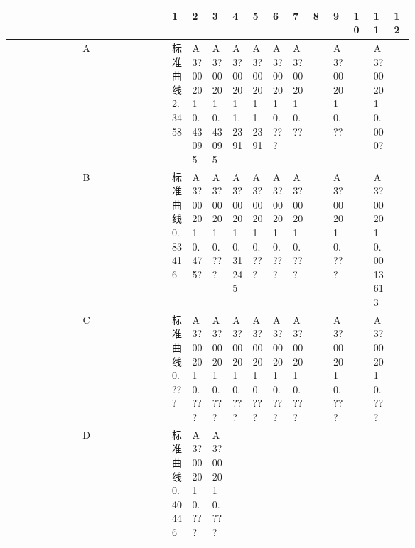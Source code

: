 \documentclass[UTF8,10pt,a4paper,fontset=fandol]{ctexart}
\renewcommand{\arraystretch}{1.15}
\begin{document}
\begin{center}
\scriptsize
\renewcommand{\arraystretch}{1.35}
\begin{tabular}{c|*{12}{p{0.055\linewidth}|}}
 & 1 & 2 & 3 & 4 & 5 & 6 & 7 & 8 & 9 & 10 & 11 & 12\\ \hline
A &
\shortstack{标准曲线\\2.3458} &
\shortstack{A3?00201\\0.43095} &
\shortstack{A3?00201\\0.43095} &
\shortstack{A3?00201\\1.2391} &
\shortstack{A3?00201\\1.2391} &
\shortstack{A3?00201\\0.???} &
\shortstack{A3?00201\\0.??} &
 &
\shortstack{A3?00201\\0.??} &
 &
\shortstack{A3?00201\\0.000?} &
\\ \hline
B &
\shortstack{标准曲线\\0.83416} &
\shortstack{A3?00201\\0.475?} &
\shortstack{A3?00201\\0.???} &
\shortstack{A3?00201\\0.31245} &
\shortstack{A3?00201\\0.???} &
\shortstack{A3?00201\\0.???} &
\shortstack{A3?00201\\0.???} &
 &
\shortstack{A3?00201\\0.???} &
 &
\shortstack{A3?00201\\0.0013613} &
\\ \hline
C &
\shortstack{标准曲线\\0.???} &
\shortstack{A3?00201\\0.???} &
\shortstack{A3?00201\\0.???} &
\shortstack{A3?00201\\0.???} &
\shortstack{A3?00201\\0.???} &
\shortstack{A3?00201\\0.???} &
\shortstack{A3?00201\\0.???} &
 &
\shortstack{A3?00201\\0.???} &
 &
\shortstack{A3?00201\\0.???} &
\\ \hline
D &
\shortstack{标准曲线\\0.40446} &
\shortstack{A3?00201\\0.???} &
\shortstack{A3?00201\\0.???} &

\end{tabular}
\end{center}
\end{document}

